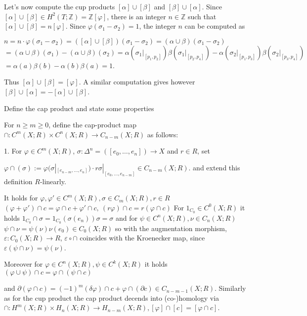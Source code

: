 Let's now compute the cup products \([\alpha] \cup [\beta]\) and \([\beta] \cup [\alpha]\). Since \([\alpha] \cup [\beta] \in H^2(T; \mathbb{Z}) = \mathbb{Z}[\varphi]\), 
there is an integer \(n \in \mathbb{Z}\) such that \([\alpha] \cup [\beta] = n[\varphi]\). Since \(\varphi(\sigma_1 - \sigma_2) = 1\), the integer \(n\) can be computed as

\(n = n \cdot \varphi (\sigma_1 - \sigma_2) = ([\alpha] \cup [\beta]) (\sigma_1 - \sigma_2) = (\alpha \cup \beta) (\sigma_1 - \sigma_2)\)
\(= (\alpha \cup \beta) (\sigma_1) - (\alpha \cup \beta) (\sigma_2) = \alpha (\sigma_1|_{[p_1, p_2]}) \beta (\sigma_1|_{[p_2, p_4]}) - \alpha (\sigma_2|_{[p_1, p_3]}) \beta (\sigma_2|_{[p_3, p_4]})\)
\(= \alpha (a) \beta (b) - \alpha (b) \beta (a) = 1\).

Thus \([\alpha] \cup [\beta] = [\varphi]\). A similar computation gives however \([\beta] \cup [\alpha] = - [\alpha] \cup [\beta]\).


Define the cap product and state some properties

For \(n \geq m \geq 0\), define the cap-product map \(\cap : C^m(X; R) \times C^n(X; R) \to C_{n-m}(X; R)\) as follows:

1. For \(\varphi \in C^m(X; R)\), \(\sigma : \Delta^n = ([e_0, \dotsc, e_n]) \to X\) and \(r \in R\), set 

\(\varphi \cap (\sigma) := \varphi(\sigma|_{[e_{n-m}, \dotsc, e_n]}) \cdot r \sigma|_{[e_0, \dotsc, e_{n-m}]} \in C_{n-m}(X; R).\)
and extend this definition \( R \)-linearly.

It holds for \( \varphi, \varphi' \in C^m(X;R), \sigma \in C_m(X;R), r \in R \)
\( (\varphi + \varphi') \cap c = \varphi \cap c + \varphi' \cap c, \ (r\varphi) \cap c = r(\varphi \cap c) \)
For \( 1_{C_0} \in C^0(X;R) \) it holds
\( 1_{C_0} \cap \sigma = 1_{C_0}(\sigma(e_n))\sigma = \sigma \)
and for \( \psi \in C^n(X;R), \nu \in C_n(X;R) \)
\( \psi \cap \nu = \psi(\nu)\nu(e_0) \in C_0(X;R) \)
so with the augmentation morphism, \( \varepsilon : C_0(X;R) \to R \), \( \varepsilon \circ \cap \) coincides with the Kroenecker map, since \( \varepsilon(\psi \cap \nu) = \psi(\nu) \).

Moreover for \( \varphi \in C^n(X;R), \psi \in C^k(X;R) \) it holds
\( (\varphi \cup \psi) \cap c = \varphi \cap (\psi \cap c) \)

and
\( \partial(\varphi \cap c) = (-1)^m(\delta \varphi) \cap c + \varphi \cap (\partial c) \in C_{n-m-1}(X;R) \).
Similarly as for the cup product the cap product decends into (co-)homology via
\( \cap : H^m(X;R) \times H_n(X;R) \to H_{n-m}(X;R), [\varphi] \cap [c] = [\varphi \cap c] \).

